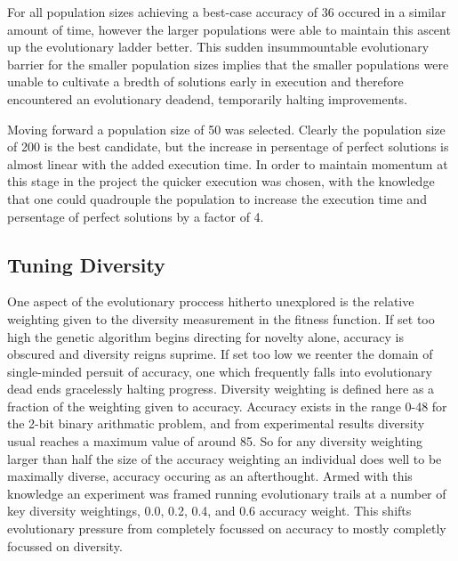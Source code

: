 For all population sizes achieving a best-case accuracy of 36 occured in a
similar amount of time, however the larger populations were able to maintain
this ascent up the evolutionary ladder better. This sudden insummountable
evolutionary barrier for the smaller population sizes implies that the smaller
populations were unable to cultivate a bredth of solutions early in execution
and therefore encountered an evolutionary deadend, temporarily halting improvements.

Moving forward a population size of 50 was selected. Clearly the population size
of 200 is the best candidate, but the increase in persentage of perfect solutions is almost
linear with the added execution time. In order to maintain momentum at this stage
in the project the quicker execution was chosen, with the knowledge that one could
quadrouple the population to increase the execution time and persentage of perfect
solutions by a factor of 4.

\subsection{Tuning Diversity}

One aspect of the evolutionary proccess hitherto unexplored is the relative
weighting given to the diversity measurement in the fitness function. If
set too high the genetic algorithm begins directing for novelty alone,
accuracy is obscured and diversity reigns suprime. If set too low we reenter
the domain of single-minded persuit of accuracy, one which frequently
falls into evolutionary dead ends gracelessly halting progress. Diversity
weighting is defined here as a fraction of the weighting given to accuracy.
Accuracy exists in the range 0-48 for the 2-bit binary arithmatic problem,
and from experimental results diversity usual reaches a maximum value of
around 85. So for any diversity weighting larger than half the size of
the accuracy weighting an individual does well to be maximally diverse,
accuracy occuring as an afterthought. Armed with this knowledge an experiment
was framed running evolutionary
trails at a number of key diversity weightings, 0.0, 0.2, 0.4, and 0.6 accuracy weight.
This shifts evolutionary pressure from completely focussed on accuracy to mostly
completly focussed on diversity.

